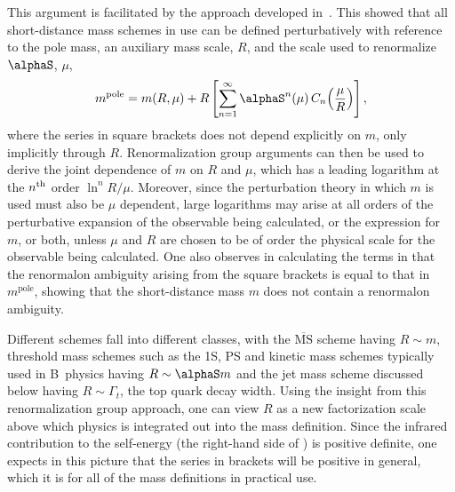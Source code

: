 This argument is facilitated by the approach developed
in~\cite{Hoang:2008yj}.  This showed that all short-distance mass
schemes in use can be defined perturbatively with reference to the pole
mass, an auxiliary mass scale, $R$, and the scale used to renormalize
$\alphaS$, $\mu$,
\begin{equation}
  \label{eq:Revolution}
  m^{\mathrm{pole}} = m(R,\mu)+R\left[\sum_{n=1}^\infty
    \alphaS^n(\mu)\,C_n\!\left(\frac{\mu}R\right)\right],
\end{equation}
where the series in square brackets does not depend explicitly on $m$,
only implicitly through $R$. Renormalization group arguments can then be
used to derive the joint dependence of $m$ on $R$ and $\mu$, which has a
leading logarithm at the $n^{\rm th}$ order $\ln^n\!R/\mu$.  Moreover,
since the perturbation theory in which $m$ is used must also be $\mu$
dependent, large logarithms may arise at all orders of the perturbative
expansion of the observable being calculated, or the expression for $m$,
or both, unless $\mu$ and $R$ are chosen to be of order the physical
scale for the observable being calculated.  One also observes in
calculating the terms in  that the renormalon
ambiguity arising from the square brackets is equal to that in
$m^{\mathrm{pole}}$, showing that the short-distance mass $m$ does not
contain a renormalon ambiguity.

Different
schemes fall into different classes, with the $\overline{\mathrm{MS}}$
scheme having $R\sim m$, threshold mass schemes such as the 1S, PS and
kinetic mass schemes typically used in B~physics having $R\sim\alphaS m$
and the jet mass scheme discussed below having $R\sim\Gamma_t$, the top
quark decay width.  Using the insight from this renormalization group
approach, one can view $R$ as a new factorization scale above which
physics is integrated out into the mass definition.
Since the infrared contribution to the self-energy (the right-hand side
of ) is positive definite, one expects in this picture that
the series in brackets will be positive in general, which it is for all
of the mass definitions in practical use.

